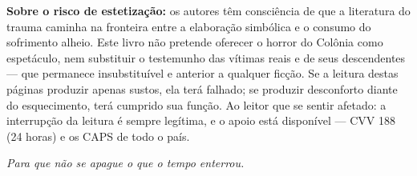 \vspace{0.8em}

\noindent \textbf{Sobre o risco de estetização:} os autores têm consciência
de que a literatura do trauma caminha na fronteira entre a elaboração
simbólica e o consumo do sofrimento alheio. Este livro não pretende
oferecer o horror do Colônia como espetáculo, nem substituir o testemunho
das vítimas reais e de seus descendentes --- que permanece insubstituível e
anterior a qualquer ficção. Se a leitura destas páginas produzir apenas
sustos, ela terá falhado; se produzir desconforto diante do esquecimento,
terá cumprido sua função. Ao leitor que se sentir afetado: a interrupção
da leitura é sempre legítima, e o apoio está disponível --- CVV 188
(24 horas) e os CAPS de todo o país.

\vspace{1.2em}

\noindent\hfill\textit{Para que não se apague o que o tempo enterrou.}\hspace{2em}
